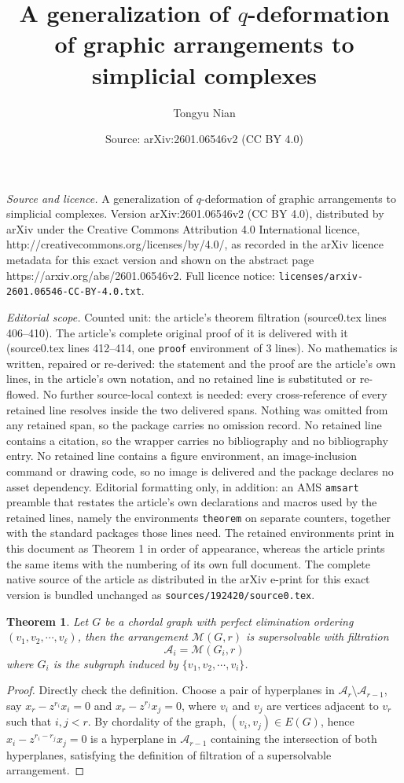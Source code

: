 \documentclass[10pt,a4paper]{amsart}
\title{A generalization of $q$-deformation of graphic arrangements to simplicial complexes}
\author{Tongyu Nian}
\date{Source: arXiv:2601.06546v2 (CC BY 4.0)}
\newtheorem{theorem}{Theorem}
\begin{document}
\maketitle

\noindent\emph{Source and licence.} A generalization of $q$-deformation of graphic arrangements to simplicial complexes. Version arXiv:2601.06546v2 (CC BY 4.0), distributed by arXiv under the Creative Commons Attribution 4.0 International licence, http://creativecommons.org/licenses/by/4.0/, as recorded in the arXiv licence metadata for this exact version and shown on the abstract page https://arxiv.org/abs/2601.06546v2. Full licence notice: \texttt{licenses/arxiv-2601.06546-CC-BY-4.0.txt}.\par\smallskip

\noindent\textit{Editorial scope.} Counted unit: the article's theorem filtration (source0.tex lines 406--410). The article's complete original proof of it is delivered with it (source0.tex lines 412--414, one \texttt{proof} environment of 3 lines). No mathematics is written, repaired or re-derived: the statement and the proof are the article's own lines, in the article's own notation, and no retained line is substituted or re-flowed.  No further source-local context is needed: every cross-reference of every retained line resolves inside the two delivered spans.  Nothing was omitted from any retained span, so the package carries no omission record.  No retained line contains a citation, so the wrapper carries no bibliography and no bibliography entry.  No retained line contains a figure environment, an image-inclusion command or drawing code, so no image is delivered and the package declares no asset dependency.  Editorial formatting only, in addition: an AMS \texttt{amsart} preamble that restates the article's own declarations and macros used by the retained lines, namely the environments \texttt{theorem} on separate counters, together with the standard packages those lines need.  The retained environments print in this document as Theorem 1 in order of appearance, whereas the article prints the same items with the numbering of its own full document.  The complete native source of the article as distributed in the arXiv e-print for this exact version is bundled unchanged as \texttt{sources/192420/source0.tex}.
\begin{theorem}\label{filtration}
    Let $G$ be a chordal graph with perfect elimination ordering $(v_1,v_2,\cdots,v_\ell)$, then the arrangement $\mathcal{M}(G,r)$ is supersolvable with filtration
    $$\mathcal{A}_i=\mathcal{M}({G_i},r)$$
    where $G_i$ is the subgraph induced by $\{v_1,v_2,\cdots,v_i\}$.
\end{theorem}

\begin{proof}
    Directly check the definition. Choose a pair of hyperplanes in $\mathcal{A}_r\setminus\mathcal{A}_{r-1}$, say $x_r-z^{r_i}x_i=0$ and $x_r-z^{r_j}x_j=0$, where $v_i$ and $v_j$ are vertices adjacent to $v_r$ such that $i,j<r$. By chordality of the graph, $(v_i,v_j)\in E(G)$, hence $x_i-z^{r_i-r_j}x_j=0$ is a hyperplane in $\mathcal{A}_{r-1}$ containing the intersection of both hyperplanes, satisfying the definition of filtration of a supersolvable arrangement.
\end{proof}
\end{document}
